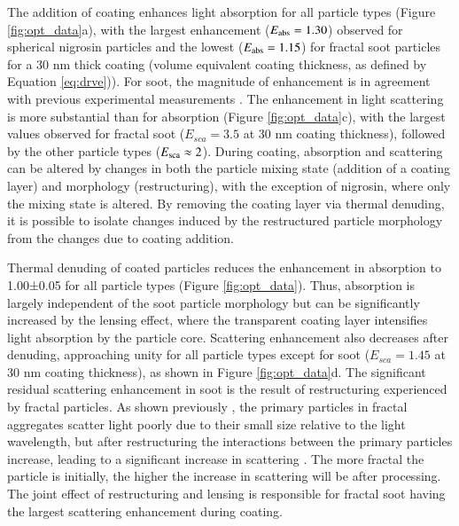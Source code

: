 \documentclass[12pt,authoryear]{elsarticle}
\begin{document}
The addition of coating enhances light absorption for all particle types (Figure \ref{fig:opt_data}a), with the largest enhancement ($E_{\rm abs}=1.30$) observed for spherical nigrosin particles and the lowest ($E_{\rm abs}=1.15$) for fractal soot particles for a 30 nm thick coating (volume equivalent coating thickness, as defined by Equation \ref{eq:drve})). For soot, the magnitude of enhancement is in agreement with previous experimental measurements \citep{RN41,RN7}. The enhancement in light scattering is more substantial than for absorption (Figure \ref{fig:opt_data}c), with the largest values observed for fractal soot ($E_{sca} = 3.5$ at 30 nm coating thickness), followed by the other particle types ($E_{\rm sca} \approx 2$). During coating, absorption and scattering can be altered by changes in both the particle mixing state (addition of a coating layer) and morphology (restructuring), with the exception of nigrosin, where only the mixing state is altered. By removing the coating layer via thermal denuding, it is possible to isolate changes induced by the restructured particle morphology from the changes due to coating addition.

Thermal denuding of coated particles reduces the enhancement in absorption to 1.00±0.05 for all particle types (Figure \ref{fig:opt_data}). Thus, absorption is largely independent of the soot particle morphology but can be significantly increased by the lensing effect, where the transparent coating layer intensifies light absorption by the particle core.
Scattering enhancement also decreases after denuding, approaching unity for all particle types except for soot ($E_{sca} = 1.45$ at 30 nm coating thickness), as shown in Figure \ref{fig:opt_data}d. The significant residual scattering enhancement in soot is the result of restructuring experienced by fractal particles. As shown previously \citep{RN40}, the primary particles in fractal aggregates scatter light poorly due to their small size relative to the light wavelength, but after restructuring the interactions between the primary particles increase, leading to a significant increase in scattering \citep{RN7}. The more fractal the particle is initially, the higher the increase in scattering will be after processing. The joint effect of restructuring and lensing is responsible for fractal soot having the largest scattering enhancement during coating.
\end{document}
